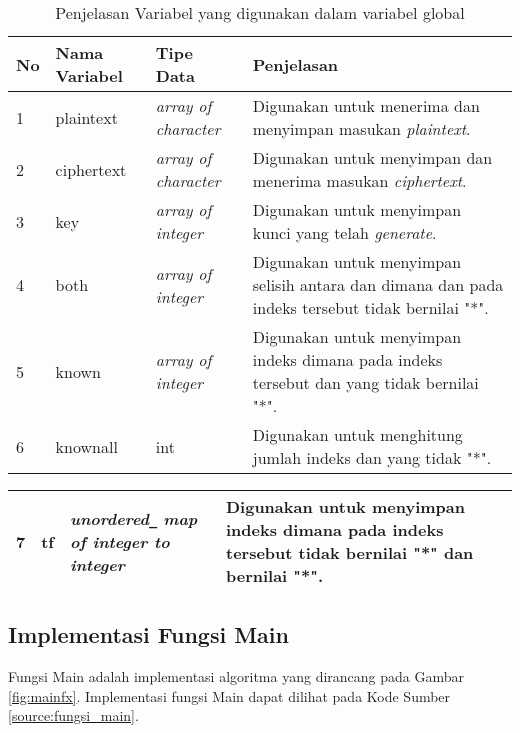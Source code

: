 \begin{table}[H]
	 	\caption{Penjelasan Variabel yang digunakan dalam variabel global}
		\begin{tabular}   {|p{0.5cm}|p{2.5cm}|p{2cm}|p{4cm}|}\hline
		No&Nama Variabel&Tipe Data&Penjelasan \\ \hline
		1&plaintext&\textit{array of character}&Digunakan untuk menerima dan  menyimpan masukan \textit{plaintext}. \\ \hline
		2&ciphertext&\textit{array of character}&Digunakan untuk menyimpan dan menerima masukan \textit{ciphertext}. \\ \hline
		3&key&\textit{array of integer}&Digunakan untuk menyimpan kunci yang telah \textit{generate}. \\ \hline
		4&both&\textit{array of integer}&Digunakan untuk menyimpan selisih antara \plaintext dan \ciphertext dimana \plaintext dan \ciphertext pada indeks tersebut tidak bernilai "*". \\ \hline
		5&known&\textit{array of integer} &Digunakan untuk menyimpan indeks dimana pada indeks tersebut \plaintext dan \ciphertext yang tidak bernilai "*". \\ \hline
		6&knownall&int&Digunakan untuk menghitung jumlah indeks \plaintext dan \ciphertext yang tidak "*". \\ \hline
		\end{tabular}%
		\label{tab:mainvar}
	\end{table}
	
	\begin{table}[H]
		\begin{tabular}   {|p{0.5cm}|p{2.5cm}|p{2cm}|p{4cm}|}\hline
		7&tf&\textit{unordered}\verb|_| \textit{map} \textit{of integer to integer}&Digunakan untuk menyimpan indeks dimana pada indeks tersebut \ciphertext tidak bernilai "*" dan \plaintext bernilai "*". \\ \hline
		\end{tabular}%
		\label{tab:mainvar}
	\end{table}	
	
\subsection{Implementasi Fungsi Main}
Fungsi Main adalah implementasi algoritma yang dirancang pada Gambar \ref{fig:mainfx}. Implementasi fungsi Main dapat dilihat pada Kode Sumber \ref{source:fungsi_main}.

